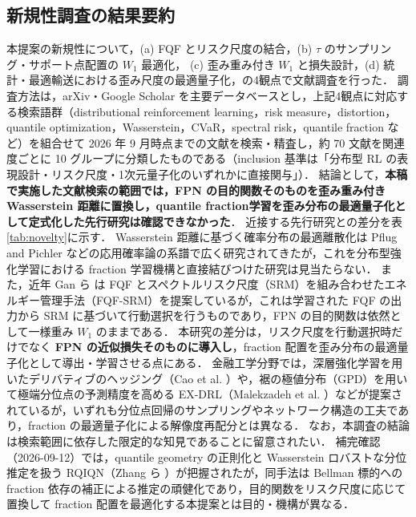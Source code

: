 \documentclass[a4paper,10pt]{jsarticle}
\theoremstyle{definition}
\newcommand{\Wone}{W_1}
\begin{document}
\subsection{新規性調査の結果要約}
本提案の新規性について，(a) FQF とリスク尺度の結合，(b) $\tau$ のサンプリング・サポート点配置の $\Wone$ 最適化，
(c) 歪み重み付き $\Wone$ と損失設計，(d) 統計・最適輸送における歪み尺度の最適量子化，の4観点で文献調査を行った．
調査方法は，arXiv・Google Scholar を主要データベースとし，上記4観点に対応する検索語群（distributional reinforcement learning，risk measure，distortion，quantile optimization，Wasserstein，CVaR，spectral risk，quantile fraction など）を組合せて 2026 年 9 月時点までの文献を検索・精査し，約 70 文献を関連度ごとに 10 グループに分類したものである（inclusion 基準は「分布型 RL の表現設計・リスク尺度・1次元量子化のいずれかに直接関与」）．
結論として，\textbf{本稿で実施した文献検索の範囲では，FPN の目的関数そのものを歪み重み付き Wasserstein 距離に置換し，quantile fraction学習を歪み分布の最適量子化として定式化した先行研究は確認できなかった}．
近接する先行研究との差分を表\ref{tab:novelty}に示す．
Wasserstein 距離に基づく確率分布の最適離散化は Pflug and Pichler \cite{pflug2014multistage} などの応用確率論の系譜で広く研究されてきたが，これを分布型強化学習における fraction 学習機構と直接結びつけた研究は見当たらない．
また，近年 Gan ら \cite{gan2026energy} は FQF とスペクトルリスク尺度（SRM）を組み合わせたエネルギー管理手法（FQF-SRM）を提案しているが，これは学習された FQF の出力から SRM に基づいて行動選択を行うものであり，FPN の目的関数は依然として一様重み $W_1$ のままである．
本研究の差分は，リスク尺度を行動選択時だけでなく \textbf{FPN の近似損失そのものに導入し}，fraction 配置を歪み分布の最適量子化として導出・学習させる点にある．
金融工学分野では，深層強化学習を用いたデリバティブのヘッジング（Cao et al. \cite{cao2021deep,cao2023gamma}）や，裾の極値分布（GPD）を用いて極端分位点の予測精度を高める EX-DRL（Malekzadeh et al. \cite{malekzadeh2024exdrl}）などが提案されているが，いずれも分位点回帰のサンプリングやネットワーク構造の工夫であり，fraction の最適量子化による解像度再配分とは異なる．
なお，本調査の結論は検索範囲に依存した限定的な知見であることに留意されたい．
補完確認（2026-09-12）では，quantile geometry の正則化と Wasserstein ロバストな分位推定を扱う RQIQN（Zhang ら \cite{zhang2026rqiqn}）が把握されたが，同手法は Bellman 標的への fraction 依存の補正による推定の頑健化であり，目的関数をリスク尺度に応じて置換して fraction 配置を最適化する本提案とは目的・機構が異なる．
\end{document}
